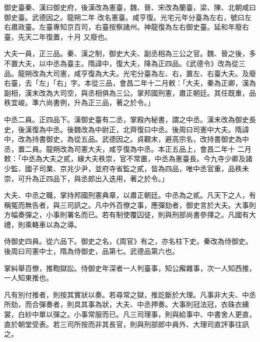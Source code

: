 
\begin{pinyinscope}

 御史臺秦、漢曰御史府，後漢改為憲臺，魏、晉、宋改為蘭臺，梁、陳、北朝咸曰御史臺。武德因之。龍朔二年
 改名憲臺。咸亨復。光宅元年分臺為左右，號曰左右肅政臺。左臺專知京百司，右臺按察諸州。神龍復為左右御史臺。延和年廢右臺，先天二年復置，十月
 又廢也。



 大夫一員，正三品。秦、漢之制，御史大夫、副丞相為三公之官。魏、晉之後，多不置大夫，以中丞為臺主。隋諱中，復大夫，降為正四品。《武德令》改為從三品。龍朔改為大司憲，咸亨復為大夫。光宅分臺為左、右，置左、右臺大夫。及廢右臺，去「左」「右」字。本從三品，會昌二年十二月敕：「大夫，秦為正卿，漢為副相，漢末改為大司空，與丞相俱為三公。掌邦國刑憲，肅正朝廷。其任既重，品秩宜峻。準六尚書例，升為正三品，著之於令。」



 中丞二員。正四品下。漢御史臺有二丞，掌殿內秘書，謂之中丞。漢末改為御史長史，後漢復為中丞。後魏改為中尉正，北齊復曰中丞。後周曰司憲中大夫。隋諱中，改為持書御史，為從五品。武德因之。貞觀末，避高宗名，改持書御史為中丞，置二員。龍朔改為司憲大夫，咸亨復為中丞。本正五品上，會昌二年十
 二月敕：「中丞為大夫之貳，緣大夫秩崇，官不常置，中丞為憲臺長。今九寺少卿及諸少監、國子司業、京兆少尹，並府寺省監之貳，皆為四品，唯中丞官重，品秩未崇，可升為正四品下，與丞郎出入迭用，著之於令。」



 大夫、中丞之職，掌持邦國刑憲典章，以肅正朝廷。中丞為之貳。凡天下之人，有稱冤而無告者，與三司訊之。凡中外百僚之事，應彈劾者，御史言於大夫。大事則方幅奏彈之，小事則署名而已。若有制使覆囚徒，則與刑部尚書參擇之。凡國有大禮，則乘輅車以為之導。



 侍御史四員。從六品下。御史之名，《周官》有之，亦名柱下史。秦改為侍御史。後周曰司憲中士，隋為侍御史，品第七。武德品第六也。



 掌糾舉百僚，推鞫獄訟。侍御史年深者一人判臺事，知公廨雜事，次一人知西推，
 一人知東推也。



 凡有別付推者，則按其實狀以奏。若尋常之獄，推訖斷於大理。凡事非大夫、中丞所劾，而合彈奏者，則具其事為狀，大夫、中丞押奏。大事則冠法冠，衣硃衣纁裳，白紗中單以彈之。小事常服而已。凡三司理事，則與給事中、中書舍人更直，直於朝堂受表。若三司所按而非其長官，則與刑部郎中員外、大理司直評事往訊之。




\end{pinyinscope}
